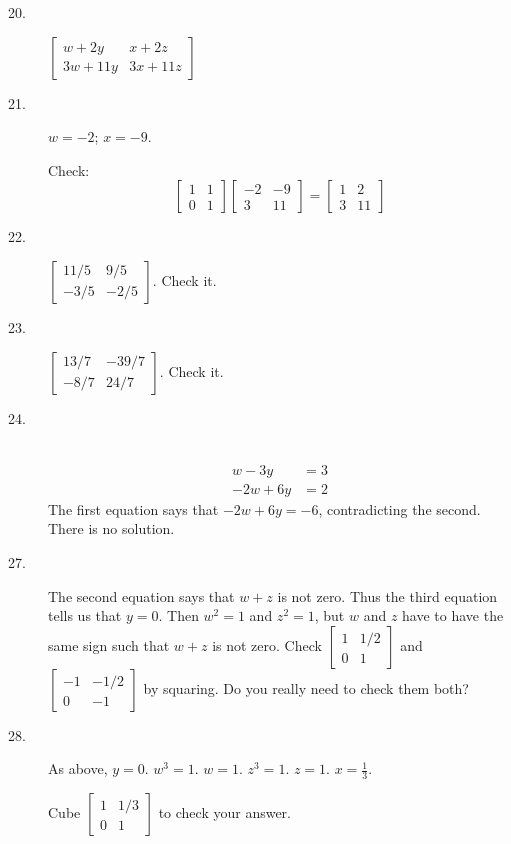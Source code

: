 \documentclass{article}
\begin{document}
\begin{description}

  \item[20.] $\begin{bmatrix} w+2y & x+2z \\ 3w+11y & 3x+11z \end{bmatrix}$

  \item[21.] $w=-2$; $x=-9$. 

    Check:
    \begin{equation*}
      \begin{bmatrix} 1 & 1 \\ 0 & 1 \end{bmatrix}
      \begin{bmatrix} -2 & -9 \\ 3 & 11 \end{bmatrix} 
      = \begin{bmatrix} 1 & 2 \\ 3 & 11 \end{bmatrix}
    \end{equation*}

  \item[22.] $\begin{bmatrix} 11/5 & 9/5 \\ -3/5 & -2/5 \end{bmatrix}$. Check it.

  \item[23.] $\begin{bmatrix} 13/7 & -39/7 \\ -8/7 & 24/7 \end{bmatrix}$. Check it.

  \item[24.] $\ $
    \begin{align*}
    w - 3y & = 3 \\
    -2w + 6y & = 2
    \end{align*}
    The first equation says that $-2w + 6y = -6$, contradicting the second. There is no solution.

  \item[27.] The second equation says that $w+z$ is not zero. Thus the third equation tells us that $y = 0$. Then $w^2 = 1$ and $z^2 = 1$, but $w$ and $z$ have to have the same sign such that $w+z$ is not zero. Check $\begin{bmatrix} 1 & 1/2 \\ 0 & 1 \end{bmatrix}$ and $\begin{bmatrix} -1 & -1/2 \\ 0 & -1 \end{bmatrix}$ by squaring. Do you really need to check them both?

  \item[28.] As above, $y = 0$. $w^3 = 1$. $w = 1$. $z^3 = 1$. $z = 1$. $x = \frac{1}{3}$. 

    Cube $\begin{bmatrix} 1 & 1/3 \\ 0 & 1 \end{bmatrix}$ to check your answer.

\end{description}
\end{document}
